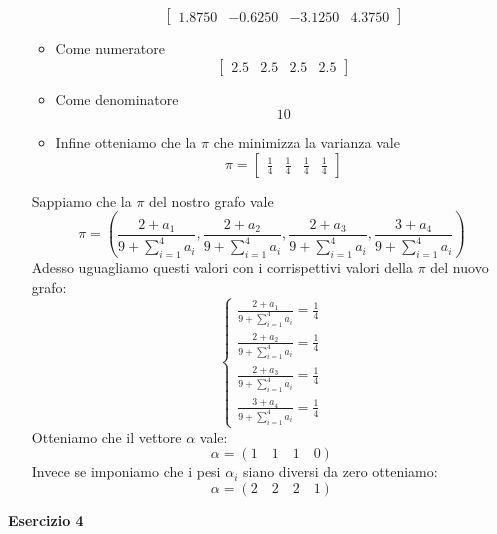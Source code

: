 \documentclass[a4paper,12pt]{article}
\begin{document}
\begin{itemize}
\begin{itemize}
\[\begin{bmatrix}
				1.8750 & -0.6250 & -3.1250 & 4.3750
			\end{bmatrix}
			\]
			\item Come numeratore\\
			\[
			\begin{bmatrix}
				2.5 & 2.5 & 2.5 & 2.5
			\end{bmatrix}
			\]
			\item Come denominatore\\
			\[
			10
			\]
			\item Infine otteniamo che la $\pi$ che minimizza la varianza vale\\
			\[
			\pi=
			\begin{bmatrix}
				\frac{1}{4} & \frac{1}{4} & \frac{1}{4} & \frac{1}{4} 
			\end{bmatrix}
			\]
		\end{itemize}
		Sappiamo che la $\pi$ del nostro grafo vale\\
		\[
		\pi=(\frac{2+a_1}{9+\sum_{i=1}^4 a_i},\frac{2+a_2}{9+\sum_{i=1}^4 a_i},\frac{2+a_3}{9+\sum_{i=1}^4 a_i},\frac{3+a_4}{9+\sum_{i=1}^4 a_i})
		\]
		Adesso uguagliamo questi valori con i corrispettivi valori della $\pi$ del nuovo grafo:\\
		\[
		\begin{cases}
			\frac{2+a_1}{9+\sum_{i=1}^4 a_i}=\frac{1}{4}\\
			\frac{2+a_2}{9+\sum_{i=1}^4 a_i}=\frac{1}{4}\\
			\frac{2+a_3}{9+\sum_{i=1}^4 a_i}=\frac{1}{4}\\
			\frac{3+a_4}{9+\sum_{i=1}^4 a_i}=\frac{1}{4}
		\end{cases}
		\]
		Otteniamo che il vettore $\alpha$ vale:\\
		\[
		\alpha=(1\quad 1\quad 1\quad 0)
		\]
		Invece se imponiamo che i pesi $\alpha_i$ siano diversi da zero otteniamo:\\
		\[
		\alpha=(2\quad 2\quad 2\quad 1)
		\]
	\end{itemize}
	\centering \textbf{Esercizio 4}\\
\end{document}
